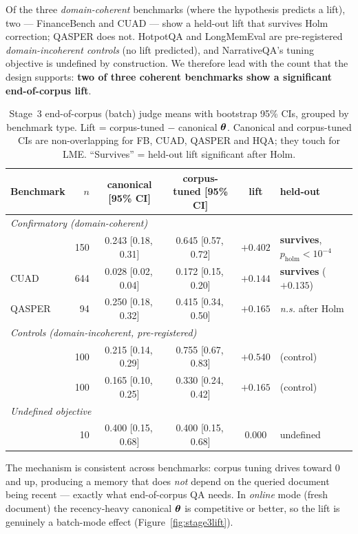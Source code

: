 Of the three \emph{domain-coherent} benchmarks (where the hypothesis predicts a
lift), two --- FinanceBench and CUAD --- show a held-out lift that survives Holm
correction; QASPER does not. HotpotQA and LongMemEval are pre-registered
\emph{domain-incoherent controls} (no lift predicted), and NarrativeQA's tuning
objective is undefined by construction. We therefore lead with the count that the
design supports: \textbf{two of three coherent benchmarks show a significant
end-of-corpus lift}.

\begin{table}[t]
\centering
\caption{Stage~3 end-of-corpus (batch) judge means with bootstrap 95\% CIs,
grouped by benchmark type. Lift = corpus-tuned $-$ canonical $\boldsymbol{\theta}$.
Canonical and corpus-tuned CIs are non-overlapping for FB, CUAD, QASPER and HQA;
they touch for LME. ``Survives'' = held-out lift significant after Holm.}
\label{tab:stage3}
\small
\begin{tabular}{l r c c c l}
\toprule
Benchmark & $n$ & canonical [95\% CI] & corpus-tuned [95\% CI] & lift & held-out \\
\midrule
\multicolumn{6}{l}{\textit{Confirmatory (domain-coherent)}}\\
\FB{}  & 150 & 0.243 [0.18,\,0.31] & 0.645 [0.57,\,0.72] & $+0.402$ & \textbf{survives}, $p_{\mathrm{holm}}<10^{-4}$ \\
CUAD   & 644 & 0.028 [0.02,\,0.04] & 0.172 [0.15,\,0.20] & $+0.144$ & \textbf{survives} ($+0.135$) \\
QASPER & 94  & 0.250 [0.18,\,0.32] & 0.415 [0.34,\,0.50] & $+0.165$ & \emph{n.s.} after Holm \\
\midrule
\multicolumn{6}{l}{\textit{Controls (domain-incoherent, pre-registered)}}\\
\HQA{} & 100 & 0.215 [0.14,\,0.29] & 0.755 [0.67,\,0.83] & $+0.540$ & (control) \\
\LME{} & 100 & 0.165 [0.10,\,0.25] & 0.330 [0.24,\,0.42] & $+0.165$ & (control) \\
\midrule
\multicolumn{6}{l}{\textit{Undefined objective}}\\
\NQA{} & 10  & 0.400 [0.15,\,0.68] & 0.400 [0.15,\,0.68] & $0.000$ & undefined \\
\bottomrule
\end{tabular}
\end{table}

The mechanism is consistent across benchmarks: corpus tuning drives \wrec{}
toward $0$ and \wembed{} up, producing a memory that does \emph{not} depend on
the queried document being recent --- exactly what end-of-corpus QA needs. In
\emph{online} mode (fresh document) the recency-heavy canonical $\boldsymbol{\theta}$ is
competitive or better, so the lift is genuinely a batch-mode effect
(Figure~\ref{fig:stage3lift}).

